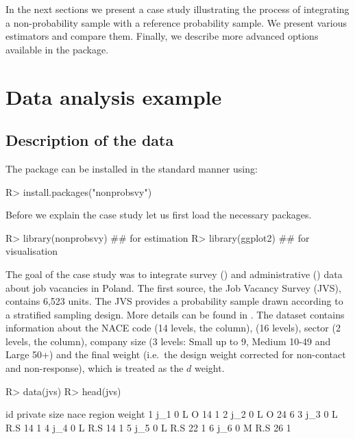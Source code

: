 \documentclass[
]{jss}
\begin{document}
In the next sections we present a case study illustrating the process of
integrating a non-probability sample with a reference probability
sample. We present various estimators and compare them. Finally, we
describe more advanced options available in the package.

\newpage

\section{Data analysis example}\label{sec-data-analysis}

\subsection{Description of the data}\label{description-of-the-data}

The package can be installed in the standard manner using:

\begin{CodeChunk}
\begin{CodeInput}
R> install.packages("nonprobsvy")
\end{CodeInput}
\end{CodeChunk}

Before we explain the case study let us first load the necessary
packages.

\begin{CodeChunk}
\begin{CodeInput}
R> library(nonprobsvy) ## for estimation
R> library(ggplot2) ## for visualisation
\end{CodeInput}
\end{CodeChunk}

The goal of the case study was to integrate survey () and
administrative () data about job vacancies in Poland. The
first source, the Job Vacancy Survey (JVS), contains 6,523 units. The
JVS provides a probability sample drawn according to a stratified
sampling design. More details can be found in \cite{jvs2022}. The
dataset contains information about the NACE code (14 levels, the
 column),  (16 levels), sector (2 levels, the
 column), company size (3 levels: Small up to 9, Medium
10-49 and Large 50+) and the final weight (i.e.~the design weight
corrected for non-contact and non-response), which is treated as the
\(d\) weight.

\begin{CodeChunk}
\begin{CodeInput}
R> data(jvs)
R> head(jvs)
\end{CodeInput}
\begin{CodeOutput}
   id private size nace region weight
1 j_1       0    L    O     14      1
2 j_2       0    L    O     24      6
3 j_3       0    L  R.S     14      1
4 j_4       0    L  R.S     14      1
5 j_5       0    L  R.S     22      1
6 j_6       0    M  R.S     26      1
\end{CodeOutput}
\end{CodeChunk}
\end{document}
